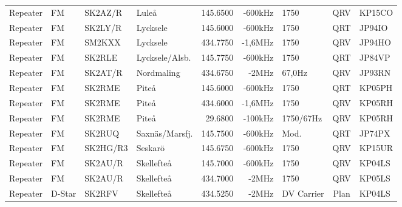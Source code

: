 \documentclass[10pt,swedish,a4paper,twoside]{article}
\begin{document}
\begin{landscape}
\begin{longtable}{llllrrlcl}
	Repeater          & FM           & SK2AZ/R       & Luleå              &          145.6500 &        -600kHz & 1750             &       QRV       & KP15CO           \\
	Repeater          & FM           & SK2LY/R       & Lycksele           &          145.6000 &        -600kHz & 1750             &       QRT       & JP94IO           \\
	Repeater          & FM           & SM2KXX        & Lycksele           &          434.7750 &        -1,6MHz & 1750             &       QRV       & JP94HO           \\
	Repeater          & FM           & SK2RLE        & Lycksele/Alsb.     &          145.7750 &        -600kHz & 1750             &       QRT       & JP84VP           \\
	Repeater          & FM           & SK2AT/R       & Nordmaling         &          434.6750 &          -2MHz & 67,0Hz           &       QRV       & JP93RN           \\
	Repeater          & FM           & SK2RME        & Piteå              &          145.6000 &        -600kHz & 1750             &       QRT       & KP05PH           \\
	Repeater          & FM           & SK2RME        & Piteå              &          434.6000 &        -1,6MHz & 1750             &       QRV       & KP05RH           \\
	Repeater          & FM           & SK2RME        & Piteå              &           29.6800 &        -100kHz & 1750/67Hz        &       QRV       & KP05RH           \\
	Repeater          & FM           & SK2RUQ        & Saxnäs/Marsfj.     &          145.7500 &        -600kHz & Mod.             &       QRT       & JP74PX           \\
	Repeater          & FM           & SK2HG/R3      & Seskarö            &          145.6750 &        -600kHz & 1750             &       QRV       & KP15UR           \\
	Repeater          & FM           & SK2AU/R       & Skellefteå         &          145.7000 &        -600kHz & 1750             &       QRV       & KP04LS           \\
	Repeater          & FM           & SK2AU/R       & Skellefteå         &          434.7000 &          -2MHz & 1750             &       QRV       & KP05LS           \\
	Repeater          & D-Star       & SK2RFV        & Skellefteå         &          434.5250 &          -2MHz & DV Carrier       &      Plan       & KP04LS           \\

\end{longtable}
\end{landscape}
\end{document}
